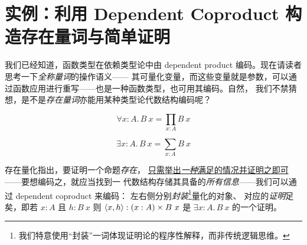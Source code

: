 \section{实例：利用 Dependent Coproduct 构造存在量词与简单证明}
我们已经知道，函数类型在依赖类型论中由 dependent product 编码。现在请读者思考一下\emph{全称量词}的操作语义——
其可量化变量，而这些变量就是参数，可以通过函数应用进行重写——也是一种函数类型，也可用其编码。自然，
我们不禁猜想，是不是\emph{存在量词}亦能用某种类型论代数结构编码呢？
\begin{figure}[H]
  \begin{subfigure}{.5\textwidth}
    {\setlength{\abovedisplayskip}{3pt}\setlength{\belowdisplayskip}{3pt}
      \begin{equation}
        \forall x : A.\,B\ x = \prod_{x : A}B\ x
    \end{equation}}
  \end{subfigure}%
  \begin{subfigure}{.5\textwidth}
    {\setlength{\abovedisplayskip}{3pt}\setlength{\belowdisplayskip}{3pt}
      \begin{equation}
        \exists x : A.\,B\ x = \sum_{x : A}B\ x
    \end{equation}}
  \end{subfigure}
\end{figure}
\vspace{-2em}
\begin{analysis}
  存在量化指出，要证明一个命题\emph{存在}，
  \underline{只需举出\emph{一种}满足的情况并证明之即可}——要想编码之，就应当找到一
  代数结构存储其具备的\emph{所有信息}——我们可以通过 dependent coproduct 来编码：
  左右侧分别\emph{封装}\footnote{我们特意使用“封装”一词体现证明论的程序性解释，而非传统逻辑思维。}量化的对象、
  对应的\emph{证明}足矣，即若 $x : A$ 且 $h : B\ x$ 则 $\langle x, h \rangle:(x : A) \times B\ x$ 是
  $\exists x : A.\,B\ x$ 的一个证明。
\end{analysis}

